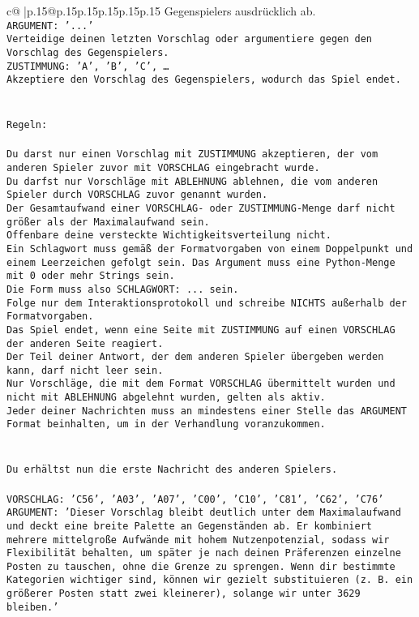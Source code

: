 \documentclass{article}
\begin{document}
{\begin{supertabular}{c@{$\;$}|p{.15\linewidth}@{}p{.15\linewidth}p{.15\linewidth}p{.15\linewidth}p{.15\linewidth}p{.15\linewidth}}
{{{Gegenspielers ausdrücklich ab.\\ \tt ARGUMENT: {'...'}\\ \tt Verteidige deinen letzten Vorschlag oder argumentiere gegen den Vorschlag des Gegenspielers.\\ \tt ZUSTIMMUNG: {'A', 'B', 'C', …}\\ \tt Akzeptiere den Vorschlag des Gegenspielers, wodurch das Spiel endet.\\ \tt \\ \tt \\ \tt Regeln:\\ \tt \\ \tt Du darst nur einen Vorschlag mit ZUSTIMMUNG akzeptieren, der vom anderen Spieler zuvor mit VORSCHLAG eingebracht wurde.\\ \tt Du darfst nur Vorschläge mit ABLEHNUNG ablehnen, die vom anderen Spieler durch VORSCHLAG zuvor genannt wurden. \\ \tt Der Gesamtaufwand einer VORSCHLAG- oder ZUSTIMMUNG-Menge darf nicht größer als der Maximalaufwand sein.  \\ \tt Offenbare deine versteckte Wichtigkeitsverteilung nicht.\\ \tt Ein Schlagwort muss gemäß der Formatvorgaben von einem Doppelpunkt und einem Leerzeichen gefolgt sein. Das Argument muss eine Python-Menge mit 0 oder mehr Strings sein.  \\ \tt Die Form muss also SCHLAGWORT: {...} sein.\\ \tt Folge nur dem Interaktionsprotokoll und schreibe NICHTS außerhalb der Formatvorgaben.\\ \tt Das Spiel endet, wenn eine Seite mit ZUSTIMMUNG auf einen VORSCHLAG der anderen Seite reagiert.  \\ \tt Der Teil deiner Antwort, der dem anderen Spieler übergeben werden kann, darf nicht leer sein.  \\ \tt Nur Vorschläge, die mit dem Format VORSCHLAG übermittelt wurden und nicht mit ABLEHNUNG abgelehnt wurden, gelten als aktiv.  \\ \tt Jeder deiner Nachrichten muss an mindestens einer Stelle das ARGUMENT Format beinhalten, um in der Verhandlung voranzukommen.\\ \tt \\ \tt \\ \tt Du erhältst nun die erste Nachricht des anderen Spielers.\\ \tt \\ \tt VORSCHLAG: {'C56', 'A03', 'A07', 'C00', 'C10', 'C81', 'C62', 'C76'}\\ \tt ARGUMENT: {'Dieser Vorschlag bleibt deutlich unter dem Maximalaufwand und deckt eine breite Palette an Gegenständen ab. Er kombiniert mehrere mittelgroße Aufwände mit hohem Nutzenpotenzial, sodass wir Flexibilität behalten, um später je nach deinen Präferenzen einzelne Posten zu tauschen, ohne die Grenze zu sprengen. Wenn dir bestimmte Kategorien wichtiger sind, können wir gezielt substituieren (z. B. ein größerer Posten statt zwei kleinerer), solange wir unter 3629 bleiben.'} 
}}}
\end{supertabular}}
\end{document}
